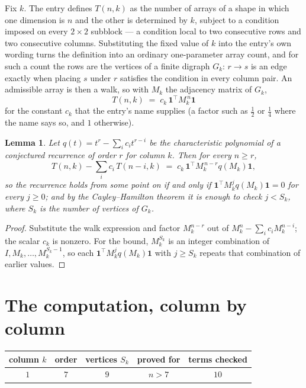 \documentclass[11pt,a4paper]{article}
\theoremstyle{plain}
\newtheorem{lemma}[theorem]{Lemma}
\theoremstyle{definition}
\begin{document}
Fix $k$. The entry defines $T(n,k)$ as the number of arrays of a shape in which one dimension
is $n$ and the other is determined by $k$, subject to a condition imposed on every
$2\times2$ subblock --- a condition local to two consecutive rows and two consecutive columns.
Substituting the fixed value of $k$ into the entry's own wording turns the definition into an
ordinary one-parameter array count, and for such a count the rows are the vertices of a finite
digraph $G_k$: $r\to s$ is an edge exactly when placing $s$ under $r$ satisfies the condition
in every column pair. An admissible array is then a walk, so with $M_k$ the adjacency matrix
of $G_k$,
\[
T(n,k)\;=\;c_k\,\mathbf{1}^{\!\top}M_k^{\,n}\mathbf{1}
\]
for the constant $c_k$ that the entry's name supplies (a factor such as $\tfrac12$ or
$\tfrac14$ where the name says so, and $1$ otherwise).

\begin{lemma}\label{lem:crit}
Let $q(t)=t^{r}-\sum_i c_it^{r-i}$ be the characteristic polynomial of a conjectured
recurrence of order $r$ for column $k$. Then for every $n\ge r$,
\[
T(n,k)-\sum_i c_i\,T(n-i,k)\;=\;c_k\,\mathbf{1}^{\!\top}M_k^{\,n-r}q(M_k)\mathbf{1},
\]
so the recurrence holds from some point on if and only if
$\mathbf{1}^{\!\top}M_k^{j}q(M_k)\mathbf{1}=0$ for every $j\ge0$; and by the
Cayley--Hamilton theorem it is enough to check $j<S_k$, where $S_k$ is the number of vertices
of $G_k$.
\end{lemma}

\begin{proof}
Substitute the walk expression and factor $M_k^{n-r}$ out of $M_k^{n}-\sum_ic_iM_k^{n-i}$;
the scalar $c_k$ is nonzero. For the bound, $M_k^{S_k}$ is an integer combination of
$I,M_k,\dots,M_k^{S_k-1}$, so each $\mathbf{1}^{\!\top}M_k^{j}q(M_k)\mathbf{1}$ with
$j\ge S_k$ repeats that combination of earlier values.
\end{proof}

\section{The computation, column by column}

\begin{center}
\begin{tabular}{ccccc}
column $k$ & order & vertices $S_k$ & proved for & terms checked \\ \hline
$1$ & $7$ & $9$ & $n>7$ & $10$ \\
\end{tabular}
\end{center}
\end{document}
